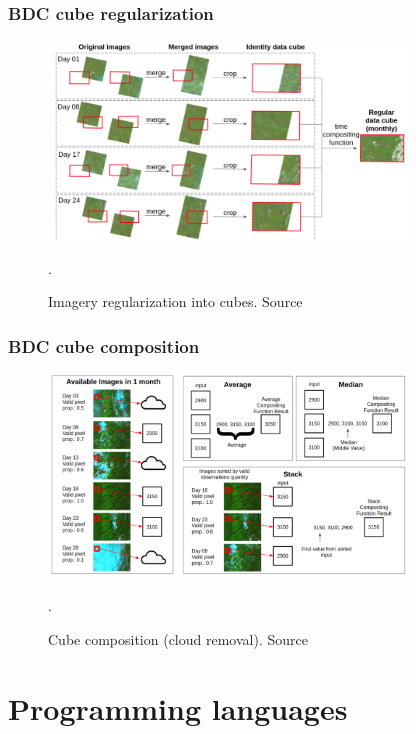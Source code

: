 \documentclass[aspectratio=169]{beamer}
\begin{document}
\begin{frame}
    \frametitle{BDC cube regularization}
    \begin{figure}
        \centering
        \includegraphics[width=0.85\textwidth]
        {img/brazil_data_cube_regularization.png}
        \caption{Imagery regularization into cubes. 
        Source~\cite{ferreira2020a}}.
        \label{fig:brazil_data_cube_regularization}
    \end{figure}
\end{frame}



\begin{frame}
    \frametitle{BDC cube composition}
    \begin{figure}
        \centering
        \includegraphics[width=0.85\textwidth]
        {img/brazil_data_cube_composition.png}
        \caption{Cube composition (cloud removal). 
        Source~\cite{ferreira2020a}}.
        \label{fig:brazil_data_cube_regularization}
    \end{figure}
\end{frame}



\section{Programming languages}
\end{document}
